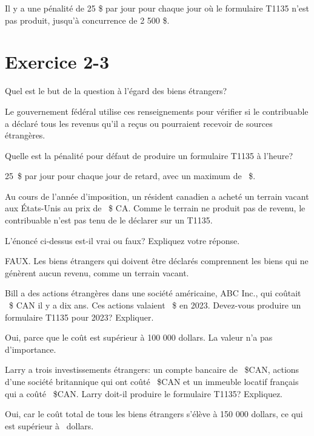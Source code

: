 Il y a une pénalité de 25 \$ par jour pour chaque jour où le formulaire T1135 n'est pas produit, jusqu'à concurrence de 2 500 \$.



\section{Exercice 2-3}
\setcounter{question}{0}
\begin{question}
	Quel est le but de la question à l'égard des biens étrangers?
\end{question}
Le gouvernement fédéral utilise ces renseignements pour vérifier si le contribuable a déclaré tous les revenus qu'il a reçus ou pourraient recevoir de sources étrangères.

\begin{question}
	Quelle est la pénalité pour défaut de produire un formulaire T1135 à l'heure?
\end{question}
25~\$ par jour pour chaque jour de retard, avec un maximum de
~\$.

\begin{question}
	Au cours de l'année d'imposition, un résident canadien a acheté un terrain vacant aux États-Unis au prix de ~\$ CA. Comme le terrain ne produit pas de revenu, le contribuable n'est pas tenu de le déclarer sur un T1135.
	
	L'énoncé ci-dessus est-il vrai ou faux? Expliquez votre réponse.
\end{question}
FAUX. Les biens étrangers qui doivent être déclarés comprennent les biens qui ne génèrent aucun revenu, comme un terrain vacant.

\begin{question}
	Bill a des actions étrangères dans une société américaine, ABC Inc., qui coûtait ~\$ CAN il y a dix ans. Ces actions valaient ~\$ en 2023. Devez-vous produire un formulaire T1135 pour 2023? Expliquer.
\end{question}
Oui, parce que le coût est supérieur à 100 000 dollars. La valeur n'a pas d'importance.

\begin{question}
	Larry a trois investissements étrangers: un compte bancaire de ~\$CAN, actions d'une société britannique qui ont coûté ~\$CAN et un immeuble locatif français qui a coûté ~\$CAN. Larry doit-il produire le formulaire T1135? Expliquez.
\end{question}
Oui, car le coût total de tous les biens étrangers s'élève à 150 000 dollars, ce qui est supérieur à ~dollars.

